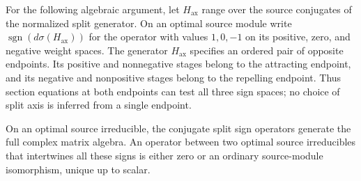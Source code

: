 For the following algebraic argument, let $H_{\mathrm{ax}}$ range over the source
conjugates of the normalized split generator.  On an optimal source module
write $\operatorname{sgn}(d\sigma(H_{\mathrm{ax}}))$ for the operator with values
$1,0,-1$ on its positive, zero, and negative weight spaces.  The generator
$H_{\mathrm{ax}}$ specifies an ordered pair of opposite endpoints.  Its positive and
nonnegative stages belong to the attracting endpoint, and its negative
and nonpositive stages belong to the repelling endpoint.  Thus section
equations at both endpoints can test all three sign spaces; no choice of
split axis is inferred from a single endpoint.

\begin{lemma}\label{lem:panels-sign-algebra}
On an optimal source irreducible, the conjugate split sign operators
generate the full complex matrix algebra.  An operator between two
optimal source irreducibles that intertwines all these signs is either
zero or an ordinary source-module isomorphism, unique up to scalar.
\end{lemma}

